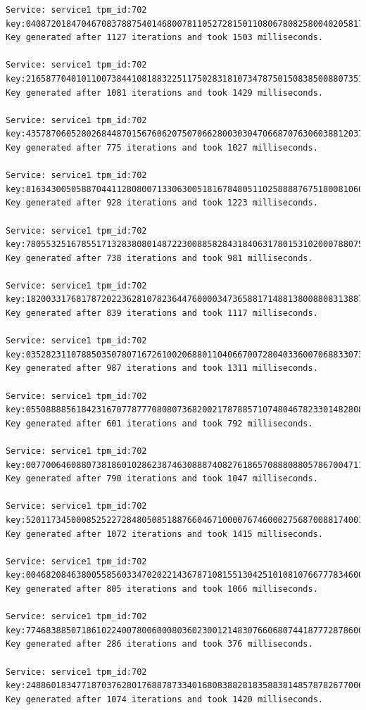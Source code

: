 \begin{lstlisting}
Service: service1 tpm_id:702 key:040872018470467083788754014680078110527281501108067808258004020581700676
Key generated after 1127 iterations and took 1503 milliseconds.

Service: service1 tpm_id:702 key:216587704010110073844108188322511750283181073478750150838500880735130815
Key generated after 1081 iterations and took 1429 milliseconds.

Service: service1 tpm_id:702 key:435787060528026844870156760620750706628003030470668707630603881203760721
Key generated after 775 iterations and took 1027 milliseconds.

Service: service1 tpm_id:702 key:816343005058870441128080071330630051816784805110258888767518008106028167
Key generated after 928 iterations and took 1223 milliseconds.

Service: service1 tpm_id:702 key:780553251678551713283808014872230088582843184063178015310200078807535328
Key generated after 738 iterations and took 981 milliseconds.

Service: service1 tpm_id:702 key:182003317681787202236281078236447600003473658817148813800880831388703710
Key generated after 839 iterations and took 1117 milliseconds.

Service: service1 tpm_id:702 key:035282311078850350780716726100206880110406670072804033600706883307330172
Key generated after 987 iterations and took 1311 milliseconds.

Service: service1 tpm_id:702 key:055088885618423167077877708080736820021787885710748046782330148280804038
Key generated after 601 iterations and took 792 milliseconds.

Service: service1 tpm_id:702 key:007700646088073818601028623874630888740827618657088808805786700471168025
Key generated after 790 iterations and took 1047 milliseconds.

Service: service1 tpm_id:702 key:520117345000852522728480508518876604671000076746000275687008817400162708
Key generated after 1072 iterations and took 1415 milliseconds.

Service: service1 tpm_id:702 key:004682084638005585603347020221436787108155130425101081076677783460007047
Key generated after 805 iterations and took 1066 milliseconds.

Service: service1 tpm_id:702 key:774683885071861022400780060008036023001214830766068074418777287860010113
Key generated after 286 iterations and took 376 milliseconds.

Service: service1 tpm_id:702 key:248860183477187037628017688787334016808388281835883814857878267700683471
Key generated after 1074 iterations and took 1420 milliseconds.


\end{lstlisting}
